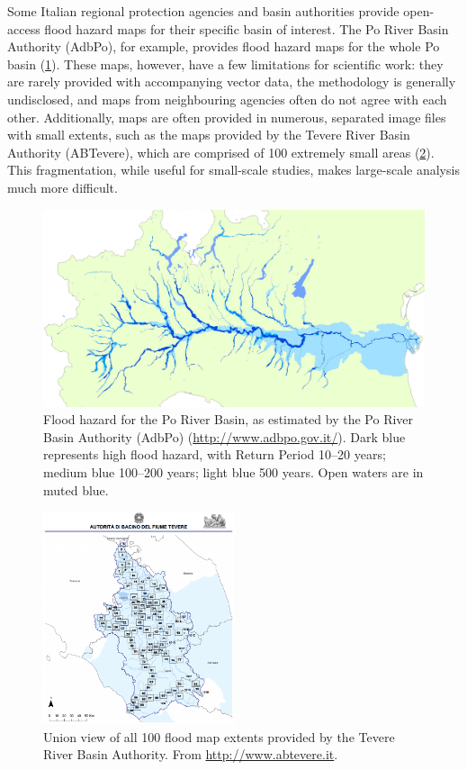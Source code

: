 Some Italian regional protection agencies and basin authorities provide open-access flood hazard maps for their specific basin of interest. The Po River Basin Authority (AdbPo), for example, provides flood hazard maps for the whole Po basin (\cref{fig:flood_po}). These maps, however, have a few limitations for scientific work: they are rarely provided with accompanying vector data, the methodology is generally undisclosed, and maps from neighbouring agencies often do not agree with each other. Additionally, maps are often provided in numerous, separated image files with small extents, such as the maps provided by the Tevere River Basin Authority (ABTevere), which are comprised of 100 extremely small areas (\cref{fig:flood_tevere_union}). This fragmentation, while useful for small-scale studies, makes large-scale analysis much more difficult.

\begin{figure}
    \centering
    \includegraphics[width=\textwidth]{figures/ita_flood/po}
    \decoRule
    \caption[Flood hazard for the Po River Basin]{Flood hazard for the Po River Basin, as estimated by the Po River Basin Authority (AdbPo) (\url{http://www.adbpo.gov.it/}). Dark blue represents high flood hazard, with Return Period 10--20 years; medium blue 100--200 years; light blue 500 years. Open waters are in muted blue.}
    \label{fig:flood_po}
\end{figure}
\begin{figure}
    \centering
    \includegraphics[width=0.5\textwidth]{figures/ita_flood/flood_tevere_union}
    \decoRule
    \caption[Union view of ABTevere flood map extents]{
    Union view of all 100 flood map extents provided by the Tevere River Basin Authority.
    From \url{http://www.abtevere.it}.
    }
    \label{fig:flood_tevere_union}
\end{figure}

